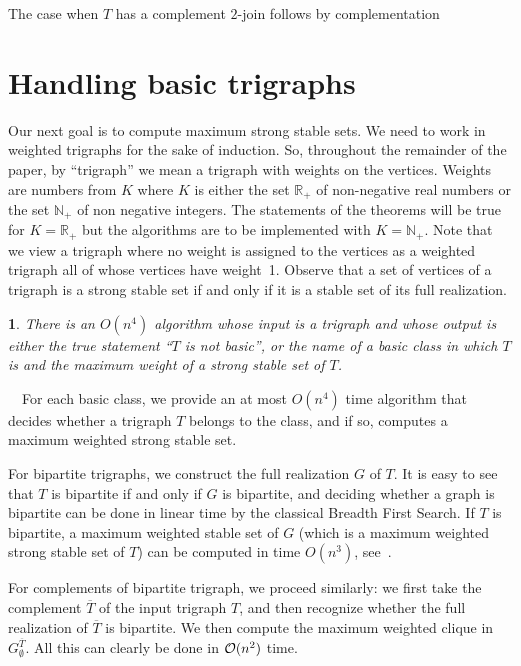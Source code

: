 \documentclass[11 pt] {article}
\newcommand\blackslug{\hbox{\hskip 1pt \vrule width 4pt height 8pt depth 1.5pt
        \hskip 1pt}}
\newcommand\bbox{\hfill \quad \blackslug \medbreak}
\newtheorem{theorem}{}[section]
\newcounter{claim}
\newcommand{\Proof}{\setcounter{claim}{0}\noindent{\bf Proof.}\ \ }
\begin{document}
The case when $T$ has a complement $2$-join follows by complementation
\bbox

\section{Handling basic trigraphs}
\label{sec:bas}

Our next goal is to compute maximum strong stable sets.  We need to
work in weighted trigraphs for the sake of induction. So, throughout
the remainder of the paper, by ``trigraph'' we mean a trigraph with
weights on the vertices.  Weights are numbers from $K$ where $K$ is
either the set $\mathbb{R}_+$ of non-negative real numbers or the set
$\mathbb{N}_+$ of non negative integers.  The statements of the
theorems will be true for $K= \mathbb{R}_+$ but the algorithms are to
be implemented with $K= \mathbb{N}_+$. Note that we view a trigraph
where no weight is assigned to the vertices as a weighted trigraph all
of whose vertices have weight~1.  Observe that a set of vertices of a
trigraph is a strong stable set if and only if it is a stable set of
its full realization.



\begin{theorem}
  \label{th:decBas}
  There is an $O(n^4)$ algorithm whose input is a trigraph and whose
  output is either the true statement ``$T$ is not basic'', or the
  name of a basic class in which $T$ is and the maximum weight of a
  strong stable set of $T$.
\end{theorem}

\Proof For each basic class, we provide an at most $O(n^4)$ time
algorithm that decides whether a trigraph $T$ belongs to the class,
and if so, computes a maximum weighted strong stable set.

For bipartite trigraphs, we construct the full realization $G$ of $T$.
It is easy to see that $T$ is bipartite if and only if $G$ is
bipartite, and deciding whether a graph is bipartite can be done in
linear time by the classical Breadth First Search.  If $T$ is
bipartite, a maximum weighted stable set of $G$ (which is a maximum
weighted strong stable set of $T$) can be computed in time $O(n^3)$,
see~\cite{schrijver:opticomb}.


For complements of bipartite trigraph, we proceed similarly: we first
take the complement $\overline{T}$ of the input trigraph $T$, and then
recognize whether the full realization of $\overline{T}$ is
bipartite. We then compute the maximum weighted clique in
$G^{\overline{T}}_{\emptyset}$. All this can clearly be done in ${\cal
  O}(n^2)$ time.
\end{document}
